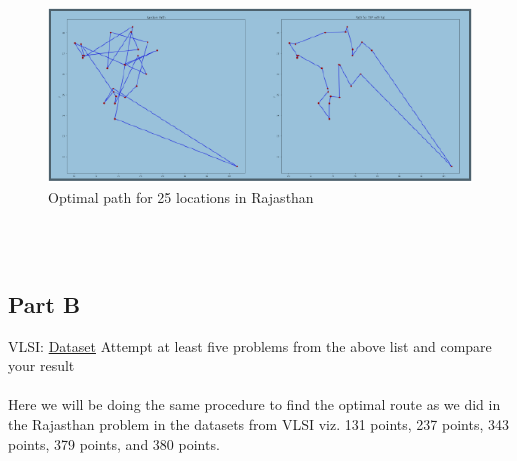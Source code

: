 \documentclass[conference]{IEEEtran}
\begin{document}
\begin{figure}[htbp]
\centerline{\includegraphics[scale=0.8]{opt.png}}
\caption{Optimal path for 25 locations in Rajasthan}
\label{fig}
\end{figure}
\\
\\


\subsection{Part B}
VLSI: \href{http://www.math.uwaterloo.ca/tsp/vlsi/index.html}{Dataset}
Attempt at least five problems from the above list and compare
your result
\\
\\

Here we will be doing the same procedure to find the optimal route as we did in the Rajasthan problem in the datasets from VLSI viz. 131 points, 237 points, 343 points, 379 points, and 380 points.
\\
\\
\end{document}
